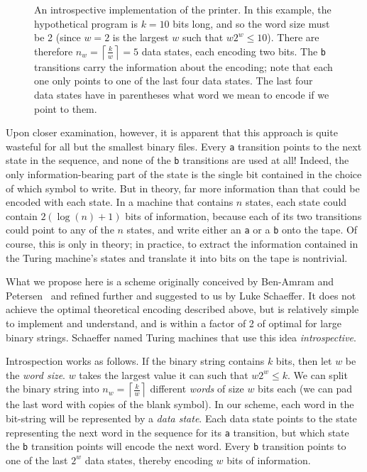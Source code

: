 \documentclass[11pt]{article}
\begin{document}
\begin{figure}
\begin{center}
\caption{An introspective implementation of the printer. In this example, the hypothetical program is $k=10$ bits long, and so the word size must be 2 (since $w=2$ is the largest $w$ such that $w2^w \le 10$). There are therefore $n_w = \left \lceil{\frac{k}{w}}\right \rceil = 5$ data states, each encoding two bits. The \texttt{b} transitions carry the information about the encoding; note that each one only points to one of the last four data states. The last four data states have in parentheses what word we mean to encode if we point to them. \label{fig:introspectprog}}
\end{center}
\end{figure}

Upon closer examination, however, it is apparent that this approach is quite wasteful for all but the smallest binary files. Every \texttt{a} transition points to the next state in the sequence, and none of the \texttt{b} transitions are used at all! Indeed, the only information-bearing part of the state is the single bit contained in the choice of which symbol to write. But in theory, far more information than that could be encoded with each state. In a machine that contains $n$ states, each state could contain $2(\log(n) + 1)$ bits of information, because each of its two transitions could point to any of the $n$ states, and write either an \texttt{a} or a \texttt{b} onto the tape. Of course, this is only in theory; in practice, to extract the information contained in the Turing machine's states and translate it into bits on the tape is nontrivial. 

What we propose here is a scheme originally conceived by Ben-Amram and Petersen~\cite{benamram} and refined further and suggested to us by Luke Schaeffer. It does not achieve the optimal theoretical encoding described above, but is relatively simple to implement and understand, and is within a factor of 2 of optimal for large binary strings. Schaeffer named Turing machines that use this idea \emph{introspective}.  

Introspection works as follows. If the binary string contains $k$ bits, then let $w$ be the \emph{word size}. $w$ takes the largest value it can such that $w2^w \le k$. We can split the binary string into $n_w = \left \lceil{\frac{k}{w}}\right \rceil$ different \emph{words} of size $w$ bits each (we can pad the last word with copies of the blank symbol). In our scheme, each word in the bit-string will be represented by a \emph{data state}. Each data state points to the state representing the next word in the sequence for its \texttt{a} transition, but which state the \texttt{b} transition points will encode the next word. Every \texttt{b} transition points to one of the last $2^w$ data states, thereby encoding $w$ bits of information. 
\end{document}
